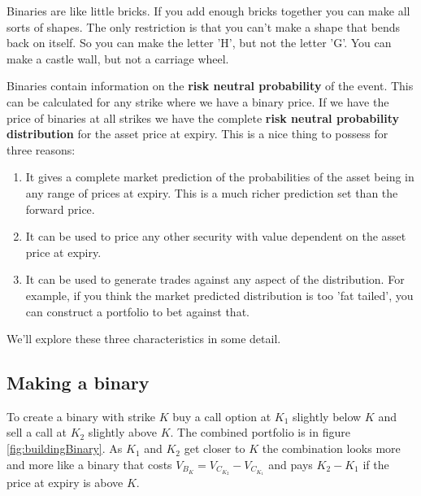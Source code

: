 
Binaries are like little bricks. If you add enough bricks together you can make all sorts of shapes. The only restriction is that you can't make a shape that bends back on itself. So you can make the letter 'H', but not the letter 'G'. You can make a castle wall, but not a carriage wheel. 

Binaries contain information on the \textbf{risk neutral probability} of the event. This can be calculated for any strike where we have a binary price. If we have the price of binaries at all strikes we have the complete \textbf{risk neutral probability distribution} for the asset price at expiry. This is a nice thing to possess for three reasons:

\begin{enumerate}
\item It gives a complete market prediction of the probabilities of the asset being in any range of prices at expiry. This is a much richer prediction set than the forward price.
\item It can be used to price any other security with value dependent on the asset price at expiry.
\item It can be used to generate trades against any aspect of the distribution. For example, if you think the market predicted distribution is too 'fat tailed', you can construct a portfolio to bet against that.
\end{enumerate}

We'll explore these three characteristics in some detail.

\subsection{Making a binary}


To create a binary with strike $K$ buy a call option at $K_1$ slightly below $K$ and sell a call at $K_2$ slightly above $K$. The combined portfolio is in figure \ref{fig:buildingBinary}. As $K_1$ and $K_2$ get closer to $K$ the combination looks more and more like a binary that costs $V_{B_K} = V_{C_{K_2}}-V_{C_{K_1}}$ and pays $K_2-K_1$ if the price at expiry is above $K$. 

